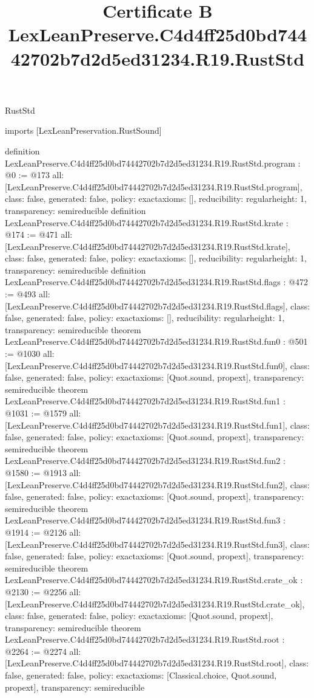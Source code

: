 \begin{lexlean}{RustStd}
\title{Certificate B LexLeanPreserve.C4d4ff25d0bd74442702b7d2d5ed31234.R19.RustStd}
\begin{coremodule}
imports [LexLeanPreservation.RustSound]

definition LexLeanPreserve.C4d4ff25d0bd74442702b7d2d5ed31234.R19.RustStd.program : @0 := @173 {
  all: [LexLeanPreserve.C4d4ff25d0bd74442702b7d2d5ed31234.R19.RustStd.program],
  class: false,
  generated: false,
  policy: exact{axioms: []},
  reducibility: regular{height: 1},
  transparency: semireducible
}
definition LexLeanPreserve.C4d4ff25d0bd74442702b7d2d5ed31234.R19.RustStd.krate : @174 := @471 {
  all: [LexLeanPreserve.C4d4ff25d0bd74442702b7d2d5ed31234.R19.RustStd.krate],
  class: false,
  generated: false,
  policy: exact{axioms: []},
  reducibility: regular{height: 1},
  transparency: semireducible
}
definition LexLeanPreserve.C4d4ff25d0bd74442702b7d2d5ed31234.R19.RustStd.flags : @472 := @493 {
  all: [LexLeanPreserve.C4d4ff25d0bd74442702b7d2d5ed31234.R19.RustStd.flags],
  class: false,
  generated: false,
  policy: exact{axioms: []},
  reducibility: regular{height: 1},
  transparency: semireducible
}
theorem LexLeanPreserve.C4d4ff25d0bd74442702b7d2d5ed31234.R19.RustStd.fun0 : @501 := @1030 {
  all: [LexLeanPreserve.C4d4ff25d0bd74442702b7d2d5ed31234.R19.RustStd.fun0],
  class: false,
  generated: false,
  policy: exact{axioms: [Quot.sound, propext]},
  transparency: semireducible
}
theorem LexLeanPreserve.C4d4ff25d0bd74442702b7d2d5ed31234.R19.RustStd.fun1 : @1031 := @1579 {
  all: [LexLeanPreserve.C4d4ff25d0bd74442702b7d2d5ed31234.R19.RustStd.fun1],
  class: false,
  generated: false,
  policy: exact{axioms: [Quot.sound, propext]},
  transparency: semireducible
}
theorem LexLeanPreserve.C4d4ff25d0bd74442702b7d2d5ed31234.R19.RustStd.fun2 : @1580 := @1913 {
  all: [LexLeanPreserve.C4d4ff25d0bd74442702b7d2d5ed31234.R19.RustStd.fun2],
  class: false,
  generated: false,
  policy: exact{axioms: [Quot.sound, propext]},
  transparency: semireducible
}
theorem LexLeanPreserve.C4d4ff25d0bd74442702b7d2d5ed31234.R19.RustStd.fun3 : @1914 := @2126 {
  all: [LexLeanPreserve.C4d4ff25d0bd74442702b7d2d5ed31234.R19.RustStd.fun3],
  class: false,
  generated: false,
  policy: exact{axioms: [Quot.sound, propext]},
  transparency: semireducible
}
theorem LexLeanPreserve.C4d4ff25d0bd74442702b7d2d5ed31234.R19.RustStd.crate_ok : @2130 := @2256 {
  all: [LexLeanPreserve.C4d4ff25d0bd74442702b7d2d5ed31234.R19.RustStd.crate_ok],
  class: false,
  generated: false,
  policy: exact{axioms: [Quot.sound, propext]},
  transparency: semireducible
}
theorem LexLeanPreserve.C4d4ff25d0bd74442702b7d2d5ed31234.R19.RustStd.root : @2264 := @2274 {
  all: [LexLeanPreserve.C4d4ff25d0bd74442702b7d2d5ed31234.R19.RustStd.root],
  class: false,
  generated: false,
  policy: exact{axioms: [Classical.choice, Quot.sound, propext]},
  transparency: semireducible
}


\end{coremodule}
\end{lexlean}
